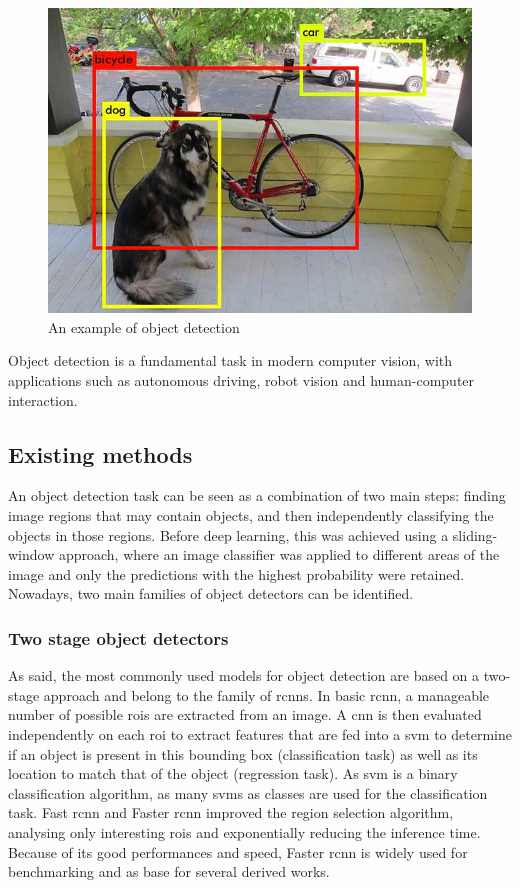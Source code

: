 \documentclass[%
    corpo=12pt,
    twoside,
    stile=classica,   
    tipotesi=magistrale,
    evenboxes,
    english,
	numerazioneromana,
]{toptesi}
\begin{document}
\begin{figure}[ht]
	\centering
	\includegraphics[width=.7\textwidth]{imgs/yolo_detection.png}
	\caption{An example of object detection\cite{redmon2016look}}
\end{figure}

Object detection is a fundamental task in modern computer vision, with applications such as autonomous driving, robot vision and human-computer interaction.

\subsection{Existing methods}\label{sec:detectors}
An object detection task can be seen as a combination of two main steps: finding image regions that may contain objects, and then independently classifying the objects in those regions. Before deep learning, this was achieved using a sliding-window approach, where an image classifier was applied to different areas of the image and only the predictions with the highest probability were retained. Nowadays, two main families of object detectors can be identified.

\subsubsection{Two stage object detectors}
As said, the most commonly used models for object detection are based on a two-stage approach and belong to the family of \glspl{rcnn}. In basic \acrshort{rcnn}\cite{girshick2014rich}, a manageable number of possible \glspl{roi} are extracted from an image. A \gls{cnn} is then evaluated independently on each \acrshort{roi} to extract features that are fed into a \gls{svm}
to determine if an object is present in this bounding box (classification task) as well as its location to match that of the object (regression task). As \gls{svm} is a binary classification algorithm, as many \glspl{svm} as classes are used for the classification task.
Fast \acrshort{rcnn}\cite{girshick2015fast} and Faster \acrshort{rcnn}\cite{ren2016faster} improved the region selection algorithm, analysing only interesting \glspl{roi} and exponentially reducing the inference time. Because of its good performances and speed, Faster \acrshort{rcnn} is widely used for benchmarking and as base for several derived works.
\end{document}
